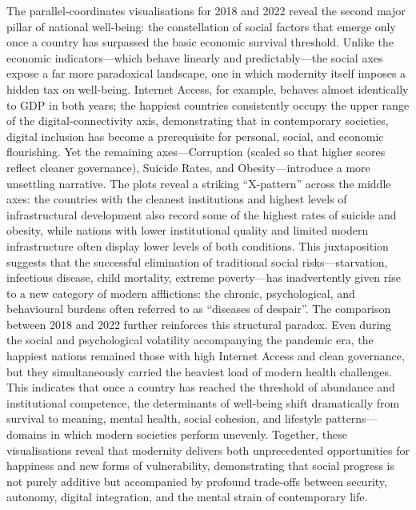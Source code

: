 \documentclass[conference]{IEEEtran}
\begin{document}
The parallel-coordinates visualisations for 2018 and 2022 reveal the second major pillar of national well-being: the constellation of social factors that emerge only once a country has surpassed the basic economic survival threshold. Unlike the economic indicators—which behave linearly and predictably—the social axes expose a far more paradoxical landscape, one in which modernity itself imposes a hidden tax on well-being. Internet Access, for example, behaves almost identically to GDP in both years; the happiest countries consistently occupy the upper range of the digital-connectivity axis, demonstrating that in contemporary societies, digital inclusion has become a prerequisite for personal, social, and economic flourishing. Yet the remaining axes—Corruption (scaled so that higher scores reflect cleaner governance), Suicide Rates, and Obesity—introduce a more unsettling narrative. The plots reveal a striking “X-pattern” across the middle axes: the countries with the cleanest institutions and highest levels of infrastructural development also record some of the highest rates of suicide and obesity, while nations with lower institutional quality and limited modern infrastructure often display lower levels of both conditions. This juxtaposition suggests that the successful elimination of traditional social risks—starvation, infectious disease, child mortality, extreme poverty—has inadvertently given rise to a new category of modern afflictions: the chronic, psychological, and behavioural burdens often referred to as “diseases of despair”. The comparison between 2018 and 2022 further reinforces this structural paradox. Even during the social and psychological volatility accompanying the pandemic era, the happiest nations remained those with high Internet Access and clean governance, but they simultaneously carried the heaviest load of modern health challenges. This indicates that once a country has reached the threshold of abundance and institutional competence, the determinants of well-being shift dramatically from survival to meaning, mental health, social cohesion, and lifestyle patterns—domains in which modern societies perform unevenly. Together, these visualisations reveal that modernity delivers both unprecedented opportunities for happiness and new forms of vulnerability, demonstrating that social progress is not purely additive but accompanied by profound trade-offs between security, autonomy, digital integration, and the mental strain of contemporary life.
\end{document}
